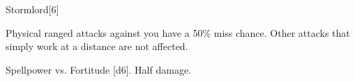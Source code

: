 \begin{spellsection}{Stormlord}[6]
    \begin{spellheader}
    \end{spellheader}
    \begin{spellcontent}
        \begin{spelltargetinginfo}
        \end{spelltargetinginfo}
        \begin{spelleffects}
            \spelleffect Physical ranged attacks against you have a 50\% miss chance. Other attacks that simply work at a distance are not affected.
            \spelldur \durshort
        \end{spelleffects}
    \end{spellcontent}
    \begin{spellsubcontent}
        \begin{spelltargetinginfo}
        \end{spelltargetinginfo}
        \begin{spelleffects}
            \begin{spellattack}{Spellpower vs. Fortitude}
                \spellsuccess {}[d6].
                \spellfailure Half damage.
            \end{spellattack}
        \end{spelleffects}
    \end{spellsubcontent}
    \begin{spellfooter}
        \miscastexplode
    \end{spellfooter}
\end{spellsection}

